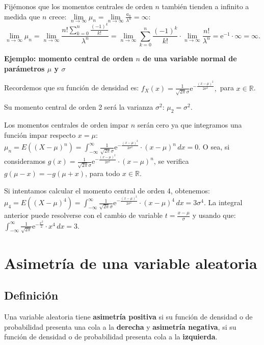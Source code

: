 \documentclass[]{book}
\begin{document}
Fijémonos que los momentos centrales de orden \(n\) también tienden a infinito a medida que \(n\) crece: \(\lim\limits_{n\to\infty}\mu_n = \lim\limits_{n\to\infty}\frac{a_n}{\lambda^n}=\infty\):
\[
\lim_{n\to\infty}\mu_n =\lim_{n\to\infty} \frac{n!\sum\limits_{k=0}^n \frac{(-1)^k}{k!}}{\lambda^n}= 
\lim_{n\to\infty}\sum\limits_{k=0}^n \frac{(-1)^k}{k!}\cdot \lim_{n\to\infty} \frac{n!}{\lambda^n}= \mathrm{e}^{-1}\cdot \infty = \infty.
\]

\textbf{Ejemplo: momento central de orden \(n\) de una variable normal de parámetros \(\mu\) y \(\sigma\)}

Recordemos que su función de densidad es: \(f_X(x)=\frac{1}{\sqrt{2\pi}\sigma}\mathrm{e}^{-\frac{(x-\mu)^2}{2\sigma^2}},\) para \(x\in \mathbb{R}\).

Su momento central de orden 2 será la varianza \(\sigma^2\): \(\mu_2 =\sigma^2.\)

Los momentos centrales de orden impar \(n\) serán cero ya que integramos una función impar respecto \(x=\mu\):
\(\mu_n = E\left((X-\mu)^n\right)=\int_{-\infty}^\infty \frac{1}{\sqrt{2\pi}\sigma}\mathrm{e}^{-\frac{(x-\mu)^2}{2\sigma^2}}\cdot (x-\mu)^n\, dx = 0.\)
O sea, si consideramos \(g(x)=\frac{1}{\sqrt{2\pi}\sigma}\mathrm{e}^{-\frac{(x-\mu)^2}{2\sigma^2}}\cdot (x-\mu)^n\), se verifica \(g(\mu-x)=-g(\mu +x)\), para todo \(x\in\mathbb{R}\).

Si intentamos calcular el momento central de orden 4, obtenemos:
\(\mu_4 = E\left((X-\mu)^4\right)=\int_{-\infty}^\infty \frac{1}{\sqrt{2\pi}\sigma}\mathrm{e}^{-\frac{(x-\mu)^2}{2\sigma^2}}\cdot (x-\mu)^4\, dx = 3\sigma^4.\) La integral anterior puede resolverse con el cambio de variable \(t=\frac{x-\mu}{\sigma}\) y usando que: \(\int_{-\infty}^\infty \frac{1}{\sqrt{2\pi}}\mathrm{e}^{-\frac{x^2}{2}}\cdot x^4\, dx = 3.\)

\hypertarget{asimetruxeda-de-una-variable-aleatoria}{%
\section{Asimetría de una variable aleatoria}\label{asimetruxeda-de-una-variable-aleatoria}}

\hypertarget{definiciuxf3n}{%
\subsection{Definición}\label{definiciuxf3n}}

Una variable aleatoria tiene \textbf{asimetría positiva} si su función de densidad o de probabilidad presenta una cola a la
\textbf{derecha} y \textbf{asimetría negativa}, si su función de densidad o de probabilidad presenta cola a la \textbf{izquierda}.
\end{document}

